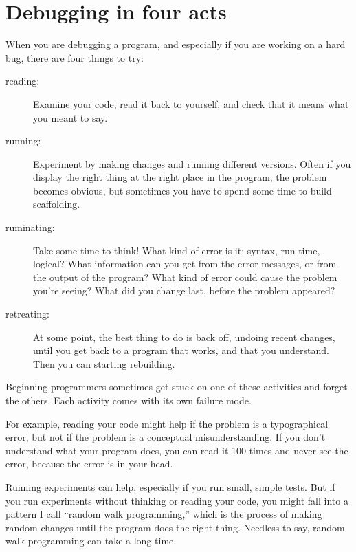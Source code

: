 \documentclass{book}
\begin{document}
\section{Debugging in four acts}

When you are debugging a program, and especially if you are
working on a hard bug, there are four things to try:

\begin{description}

\item[reading:] Examine your code, read it back to yourself, and
check that it means what you meant to say.

\item[running:] Experiment by making changes and running different
versions.  Often if you display the right thing at the right place
in the program, the problem becomes obvious, but sometimes you have to
spend some time to build scaffolding.

\item[ruminating:] Take some time to think!  What kind of error
is it: syntax, run-time, logical?  What information can you get from
the error messages, or from the output of the program?  What kind of
error could cause the problem you're seeing?  What did you change
last, before the problem appeared?

\item[retreating:] At some point, the best thing to do is back
off, undoing recent changes, until you get back to a program that
works, and that you understand.  Then you can starting rebuilding.

\end{description}

Beginning programmers sometimes get stuck on one of these activities
and forget the others.  Each activity comes with its own failure
mode.

For example, reading your code might help if the problem is a
typographical error, but not if the problem is a conceptual
misunderstanding.  If you don't understand what your program does, you
can read it 100 times and never see the error, because the error is in
your head.

Running experiments can help, especially if you run small, simple
tests.  But if you run experiments without thinking or reading your
code, you might fall into a pattern I call ``random walk programming,''
which is the process of making random changes until the program
does the right thing.  Needless to say, random walk programming
can take a long time.
\end{document}
